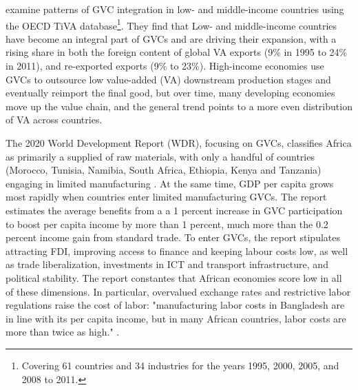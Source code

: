 \documentclass[a4paper]{article}
\begin{document}
\citet{Kummritz20162} examine patterns of GVC integration in low- and middle-income countries using the OECD TiVA database\footnote{Covering 61 countries and 34 industries for the years 1995, 2000, 2005, and 2008 to 2011.}. They find that %
Low- and middle-income countries have become an integral part of GVCs and are driving their expansion, with a rising share in both the foreign content of global VA exports (9\% in 1995 to 24\% in 2011), and re-exported exports (9\% to 23\%). High-income economies use GVCs to outsource low value-added (VA) downstream production stages and eventually reimport the final good, but over time, many developing economies move up the value chain, and the general trend points to a more even distribution of VA across countries. \newline %

The 2020 World Development Report (WDR), focusing on GVCs, classifies Africa as primarily a supplied of raw materials, with only a handful of countries (Morocco, Tunisia, Namibia, South Africa, Ethiopia, Kenya and Tanzania) engaging in limited manufacturing \citep{world2020trading}. At the same time, GDP per capita grows most rapidly when countries enter limited manufacturing GVCs. The report estimates the average benefits from a a 1 percent increase in GVC participation to boost per capita income by more than 1 percent, much more than the 0.2 percent income gain from standard trade. To enter GVCs, the report stipulates attracting FDI, improving access to finance and keeping labour costs low, as well as trade liberalization, investments in ICT and transport infrastructure, and political stability. The report constantes that African economies score low in all of these dimensions. In particular, overvalued exchange rates and restrictive labor
regulations raise the cost of labor: "manufacturing labor costs in Bangladesh are in line with its per capita income, but in many African countries, labor costs are more than twice as high." \citep{world2020trading}. \newline
\end{document}
